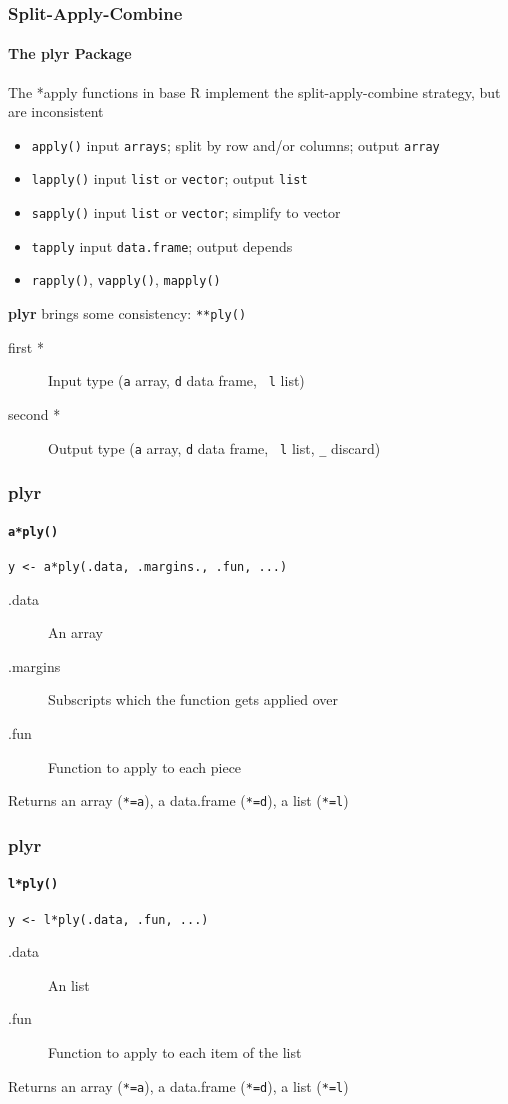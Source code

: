 \documentclass[paper=screen,mathserif]{beamer}\usepackage[]{graphicx}\usepackage[]{color}
\newcommand{\ft}[1]{\frametitle{#1}}
\newcommand{\fst}[1]{\framesubtitle{#1}}
\begin{document}
\begin{frame}[fragile]
    \ft{Split-Apply-Combine}
    \fst{The {\bf plyr} Package}
    
    The *apply functions in base R implement the split-apply-combine
    strategy, but are inconsistent
    \begin{itemize}
    \item \verb=apply()= input {\tt arrays}; split by row and/or columns;
      output {\tt array} 
    \item \verb=lapply()= input {\tt list} or {\tt vector}; output
      {\tt list}
    \item \verb=sapply()= input {\tt list} or {\tt vector}; simplify
      to vector
    \item \verb=tapply= input {\tt data.frame}; output depends
    \item \verb=rapply()=, \verb=vapply()=, \verb=mapply()=
    \end{itemize}\pause\vspace{0.3cm}
    {\bf plyr} brings some consistency: \verb=**ply()=
    \begin{description}
    \item[first *] Input type ({\tt a} array, {\tt d} data frame, {\tt
        l} list)
    \item[second *] Output type ({\tt a} array, {\tt d} data frame, {\tt
        l} list, \verb=_= discard)
    \end{description}
  
\end{frame}

\begin{frame}[fragile]
  \ft{{\bf plyr}}
  \fst{{\tt a*ply()}}
  
  \verb=y <- a*ply(.data, .margins., .fun, ...)=
  \vspace{0.5cm}
  \begin{description}
  \item[.data] An array
  \item[.margins] Subscripts which the function gets applied over
  \item[.fun] Function to apply to each piece
  \end{description}
  Returns an array (\verb|*=a|), a data.frame (\verb|*=d|), a list
  (\verb|*=l|)
  
\end{frame}

\begin{frame}[fragile]
  \ft{{\bf plyr}}
  \fst{{\tt l*ply()}}
  
  \verb=y <- l*ply(.data, .fun, ...)=
  \vspace{0.5cm}
  \begin{description}
  \item[.data] An list
  \item[.fun] Function to apply to each item of the list
  \end{description}
  Returns an array (\verb|*=a|), a data.frame (\verb|*=d|), a list
  (\verb|*=l|)
  
\end{frame}
\end{document}
